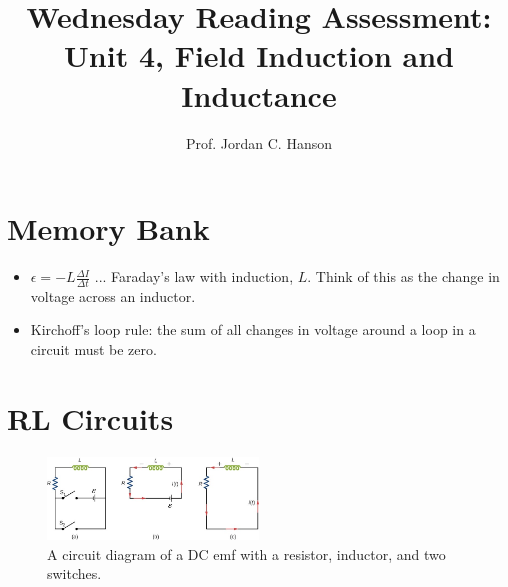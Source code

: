 \documentclass{article}
\begin{document}
\title{Wednesday Reading Assessment: Unit 4, Field Induction and Inductance}
\author{Prof. Jordan C. Hanson}

\maketitle

\section{Memory Bank}

\begin{itemize}
\item $\epsilon = -L \frac{\Delta I}{\Delta t}$ ... Faraday's law with induction, $L$.  Think of this as the change in voltage across an inductor.
\item Kirchoff's loop rule: the sum of all changes in voltage around a loop in a circuit must be zero.
\end{itemize}

\section{RL Circuits}

\begin{figure}
\centering
\includegraphics[width=0.5\textwidth]{rl.jpeg}
\caption{\label{fig:rl} A circuit diagram of a DC emf with a resistor, inductor, and two switches.}
\end{figure}
\end{document}
